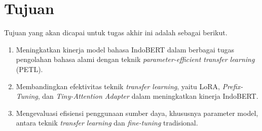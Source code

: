 \section{Tujuan}

Tujuan yang akan dicapai untuk tugas akhir ini adalah sebagai berikut.

\begin{enumerate}
    \item Meningkatkan kinerja model bahasa IndoBERT dalam berbagai tugas pengolahan bahasa alami dengan teknik \textit{parameter-efficient transfer learning} (PETL).
    \item Membandingkan efektivitas teknik \textit{transfer learning}, yaitu LoRA, \textit{Prefix-Tuning}, dan \textit{Tiny-Attention Adapter} dalam meningkatkan kinerja IndoBERT.
    \item Mengevaluasi efisiensi penggunaan sumber daya, khususnya parameter model, antara teknik \textit{transfer learning} dan \textit{fine-tuning} tradisional.
\end{enumerate}